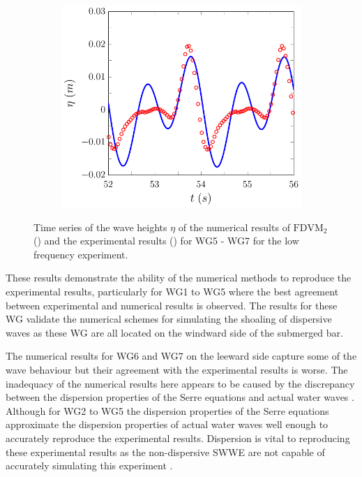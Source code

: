 \begin{figure}
\begin{subfigure}{0.5\textwidth}
		\vspace{0.5cm}
	\end{subfigure}
	\begin{subfigure}{0.5\textwidth}
		\includegraphics[width=\textwidth]{./chp6/figures/Experiment/Beji/sl/FDVMWG7.pdf}
		\vspace{0.5cm}
	\end{subfigure}
	\caption{Time series of the wave heights $\eta$ of the numerical results of $\text{FDVM}_2$ ({\color{blue}\solidrule}) and the experimental results () for WG5 - WG7 for the low frequency experiment.}
	\label{fig:BejislWG5to7FDVM}
\end{figure}
%
These results demonstrate the ability of the numerical methods to reproduce the experimental results, particularly for WG1 to WG5 where the best agreement between experimental and numerical results is observed. The results for these WG validate the numerical schemes for simulating the shoaling of dispersive waves as these WG are all located on the windward side of the submerged bar. 

The numerical results for WG6 and WG7 on the leeward side capture some of the wave behaviour but their agreement with the experimental results is worse. The inadequacy of the numerical results here appears to be caused by the discrepancy between the dispersion properties of the Serre equations and actual water waves \cite{Beji-Battjes-1994-1,Lannes-2013}. Although for WG2 to WG5 the dispersion properties of the Serre equations approximate the dispersion properties of actual water waves well enough to accurately reproduce the experimental results. Dispersion is vital to reproducing these experimental results as the non-dispersive SWWE are not capable of accurately simulating this experiment \cite{Pitt-2017-1725}.

